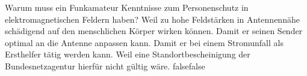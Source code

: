     {Warum muss ein Funkamateur Kenntnisse zum Personenschutz in elektromagnetischen Feldern haben?}
    {Weil zu hohe Feldstärken in Antennennähe schädigend auf den menschlichen Körper wirken können.}
    {Damit er seinen Sender optimal an die Antenne anpassen kann.}
    {Damit er bei einem Stromunfall als Ersthelfer tätig werden kann.}
    {Weil eine Standortbescheinigung der Bundesnetzagentur hierfür nicht gültig wäre.}
    {false}{false}